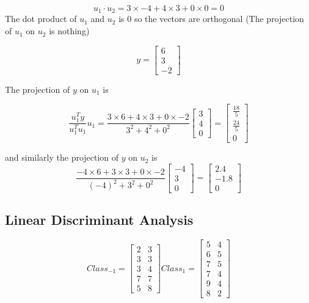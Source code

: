 \documentclass{article}
\begin{document}
\[ u_1 \cdot u_2 = 3 \times -4 + 4 \times 3 + 0 \times 0 = 0 \] The dot
product of \(u_1\) and \(u_2\) is \(0\) so the vectors are orthogonal
(The projection of \(u_1\) on \(u_2\) is nothing)

\[ y = \begin{bmatrix}
6 \\ 3 \\ -2
\end{bmatrix}
\]

The projection of \(y\) on \(u_1\) is

\[ \frac{u_1^Ty}{u_1^Tu_1}u_1 = \frac{3 \times 6 + 4 \times 3 + 0 \times -2}{3^2 + 4^2 + 0^2} \begin{bmatrix}
3 \\ 4 \\ 0 
\end{bmatrix}
= \begin{bmatrix} \frac{18}{5} \\ \frac{24}{5} \\ 0\end{bmatrix}
\]

and similarly the projection of \(y\) on \(u_2\) is \[
\frac{-4 \times 6 + 3 \times 3 + 0 \times -2}{(-4)^2 + 3^2 + 0^2} \begin{bmatrix}
-4 \\ 3 \\ 0
\end{bmatrix} = \begin{bmatrix}
2.4 \\ -1.8  \\ 0
\end{bmatrix}
\]

    \hypertarget{linear-discriminant-analysis}{%
\subsection{Linear Discriminant
Analysis}\label{linear-discriminant-analysis}}

    \[Class_{-1} = \begin{bmatrix}
2 & 3 \\
3 & 3 \\
3 & 4 \\
7 & 7 \\
5 & 8
\end{bmatrix}
Class_1 = \begin{bmatrix}
5 & 4 \\
6 & 5 \\
7 & 5 \\
7 & 4 \\
9 & 4 \\
8 & 2
\end{bmatrix}\]
\end{document}

